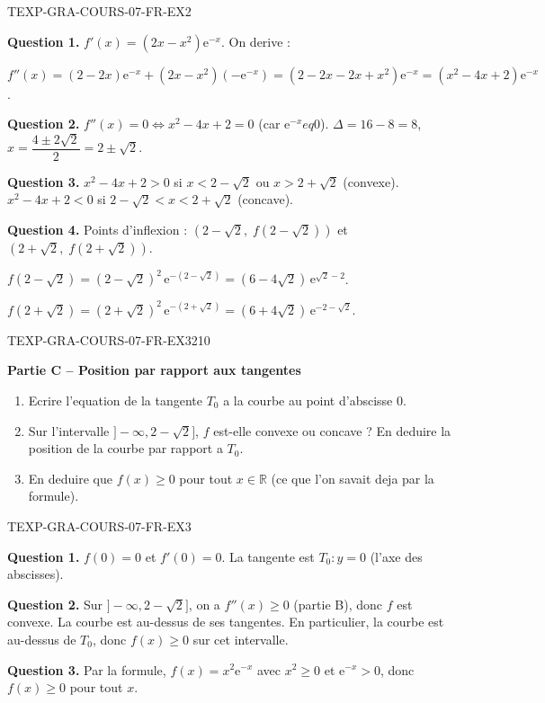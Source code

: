 \begin{corrige}{TEXP-GRA-COURS-07-FR-EX2}

\textbf{Question 1.} $f'(x) = (2x - x^2)\mathrm{e}^{-x}$. On derive :

$f''(x) = (2 - 2x)\mathrm{e}^{-x} + (2x - x^2)(-\mathrm{e}^{-x}) = (2 - 2x - 2x + x^2)\mathrm{e}^{-x} = (x^2 - 4x + 2)\mathrm{e}^{-x}$.

\textbf{Question 2.} $f''(x) = 0 \iff x^2 - 4x + 2 = 0$ (car $\mathrm{e}^{-x} 
eq 0$). $\Delta = 16 - 8 = 8$, $x = \dfrac{4 \pm 2\sqrt{2}}{2} = 2 \pm \sqrt{2}$.

\textbf{Question 3.} $x^2 - 4x + 2 > 0$ si $x < 2 - \sqrt{2}$ ou $x > 2 + \sqrt{2}$ (convexe). $x^2 - 4x + 2 < 0$ si $2 - \sqrt{2} < x < 2 + \sqrt{2}$ (concave).

\textbf{Question 4.} Points d'inflexion : $(2 - \sqrt{2},\; f(2-\sqrt{2}))$ et $(2 + \sqrt{2},\; f(2+\sqrt{2}))$.

$f(2-\sqrt{2}) = (2-\sqrt{2})^2\,\mathrm{e}^{-(2-\sqrt{2})} = (6-4\sqrt{2})\,\mathrm{e}^{\sqrt{2}-2}$.

$f(2+\sqrt{2}) = (2+\sqrt{2})^2\,\mathrm{e}^{-(2+\sqrt{2})} = (6+4\sqrt{2})\,\mathrm{e}^{-2-\sqrt{2}}$.

\end{corrige}

\bigskip


\begin{exercice}{TEXP-GRA-COURS-07-FR-EX3}{2}{10}

\textbf{Partie C -- Position par rapport aux tangentes}

\begin{enumerate}
  \item Ecrire l'equation de la tangente $T_0$ a la courbe au point d'abscisse $0$.
  \item Sur l'intervalle $]-\infty, 2 - \sqrt{2}]$, $f$ est-elle convexe ou concave ? En deduire la position de la courbe par rapport a $T_0$.
  \item En deduire que $f(x) \geq 0$ pour tout $x \in \mathbb{R}$ (ce que l'on savait deja par la formule).
\end{enumerate}

\end{exercice}

\begin{corrige}{TEXP-GRA-COURS-07-FR-EX3}

\textbf{Question 1.} $f(0) = 0$ et $f'(0) = 0$. La tangente est $T_0 : y = 0$ (l'axe des abscisses).

\textbf{Question 2.} Sur $]-\infty, 2 - \sqrt{2}]$, on a $f''(x) \geq 0$ (partie B), donc $f$ est convexe. La courbe est au-dessus de ses tangentes. En particulier, la courbe est au-dessus de $T_0$, donc $f(x) \geq 0$ sur cet intervalle.

\textbf{Question 3.} Par la formule, $f(x) = x^2 \mathrm{e}^{-x}$ avec $x^2 \geq 0$ et $\mathrm{e}^{-x} > 0$, donc $f(x) \geq 0$ pour tout $x$.

\end{corrige}
